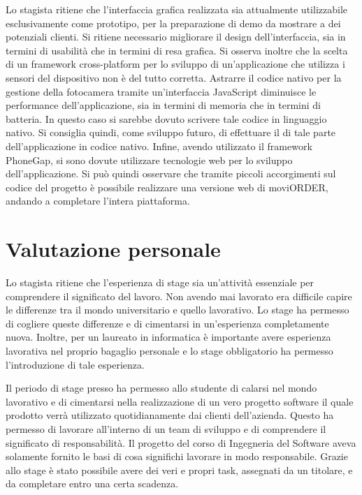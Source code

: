 Lo stagista ritiene che l'interfaccia grafica realizzata sia attualmente utilizzabile esclusivamente come prototipo, per la preparazione di demo da mostrare a dei potenziali clienti. Si ritiene necessario migliorare il design dell'interfaccia, sia in termini di usabilità che in termini di resa grafica. 
Si osserva inoltre che la scelta di un framework cross-platform per lo sviluppo di un'applicazione che utilizza i sensori del dispositivo non è del tutto corretta. Astrarre il codice nativo per la gestione della fotocamera tramite un'interfaccia JavaScript diminuisce le performance dell'applicazione, sia in termini di memoria che in termini di batteria. In questo caso si sarebbe dovuto scrivere tale codice in linguaggio nativo. Si consiglia quindi, come sviluppo futuro, di effettuare il  di tale parte dell'applicazione in codice nativo.
Infine, avendo utilizzato il framework PhoneGap, si sono dovute utilizzare tecnologie web per lo sviluppo dell'applicazione. Si può quindi osservare che tramite piccoli accorgimenti sul codice del progetto è possibile realizzare una versione web di moviORDER, andando a completare l'intera piattaforma.

\section{Valutazione personale}

Lo stagista ritiene che l'esperienza di stage sia un'attività essenziale per comprendere il significato del lavoro. Non avendo mai lavorato era difficile capire le differenze tra il mondo universitario e quello lavorativo. Lo stage ha permesso di cogliere queste differenze e di cimentarsi in un'esperienza completamente nuova. Inoltre, per un laureato in informatica è importante avere esperienza lavorativa nel proprio bagaglio personale e lo stage obbligatorio ha permesso l'introduzione di tale esperienza.

Il periodo di stage presso \visione{} ha permesso allo studente di calarsi nel mondo lavorativo e di cimentarsi nella realizzazione di un vero progetto software il quale prodotto verrà utilizzato quotidianamente dai clienti dell'azienda. Questo ha permesso di lavorare all'interno di un team di sviluppo e di comprendere il significato di responsabilità. Il progetto del corso di Ingegneria del Software aveva solamente fornito le basi di cosa significhi lavorare in modo responsabile. Grazie allo stage è stato possibile avere dei veri e propri task, assegnati da un titolare, e da completare entro una certa scadenza.


